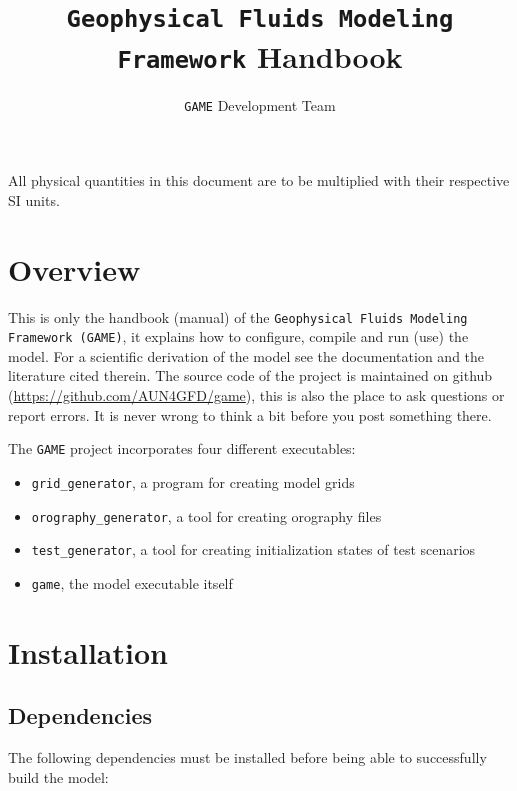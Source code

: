 \documentclass[10pt]{report}
\title{\texttt{Geophysical Fluids Modeling Framework} Handbook}
\author{\texttt{GAME} Development Team}
\begin{document}
\maketitle

\vspace*{5 cm}
\begin{center}
All physical quantities in this document are to be multiplied with their respective SI units.
\end{center}

\newpage

\tableofcontents

\chapter{Overview}
\label{chap:overview}

This is only the handbook (manual) of the \texttt{Geophysical Fluids Modeling Framework (GAME)}, it explains how to configure, compile and run (use) the model. For a scientific derivation of the model see the documentation and the literature cited therein. The source code of the project is maintained on github (\url{https://github.com/AUN4GFD/game}), this is also the place to ask questions or report errors. It is never wrong to think a bit before you post something there.

The \texttt{GAME} project incorporates four different executables:

\begin{itemize}
\item \texttt{grid\_generator}, a program for creating model grids
\item \texttt{orography\_generator}, a tool for creating orography files
\item \texttt{test\_generator}, a tool for creating initialization states of test scenarios
\item \texttt{game}, the model executable itself
\end{itemize}

\chapter{Installation}
\label{chap:installation}

\section{Dependencies}
\label{sec:dependencies}

The following dependencies must be installed before being able to successfully build the model:
\end{document}

